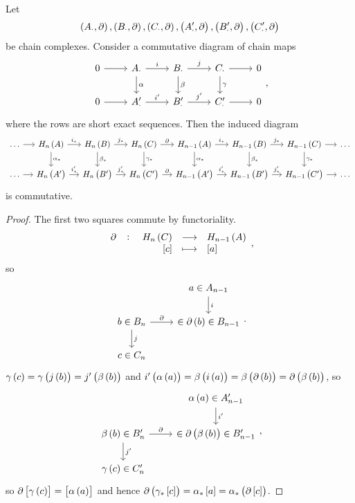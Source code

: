 \begin{proposition}
Let
$$ \br{A_\cdot, \partial}, \br{B_\cdot, \partial}, \br{C_\cdot, \partial}, \br{A_\cdot', \partial}, \br{B_\cdot', \partial}, \br{C_\cdot', \partial} $$
be chain complexes. Consider a commutative diagram of chain maps
$$
\begin{tikzcd}
0 \arrow{r} & A_\cdot \arrow{r}{i} \arrow{d}{\alpha} & B_\cdot \arrow{r}{j} \arrow{d}{\beta} & C_\cdot \arrow{r} \arrow{d}{\gamma} & 0 \\
0 \arrow{r} & A_\cdot' \arrow{r}{i'} & B_\cdot' \arrow{r}{j'} & C_\cdot' \arrow{r} & 0
\end{tikzcd},
$$
where the rows are short exact sequences. Then the induced diagram
$$
\begin{tikzcd}[column sep=small]
\dots \arrow{r} & H_n\br{A} \arrow{r}{i_*} \arrow{d}{\alpha_*} & H_n\br{B} \arrow{r}{j_*} \arrow{d}{\beta_*} & H_n\br{C} \arrow{r}{\partial} \arrow{d}{\gamma_*} & H_{n - 1}\br{A} \arrow{r}{i_*} \arrow{d}{\alpha_*} & H_{n - 1}\br{B} \arrow{r}{j_*} \arrow{d}{\beta_*} & H_{n - 1}\br{C} \arrow{r} \arrow{d}{\gamma_*} & \dots \\
\dots \arrow{r} & H_n\br{A'} \arrow{r}{i_*'} & H_n\br{B'} \arrow{r}{j_*'} & H_n\br{C'} \arrow{r}{\partial} & H_{n - 1}\br{A'} \arrow{r}{i_*'} & H_{n - 1}\br{B'} \arrow{r}{j_*'} & H_{n - 1}\br{C'} \arrow{r} & \dots
\end{tikzcd}
$$
is commutative.
\end{proposition}

\begin{proof}
The first two squares commute by functoriality.
$$ \function[\partial]{H_n\br{C}}{H_{n - 1}\br{A}}{\sbr{c}}{\sbr{a}}, $$
so
$$
\begin{tikzcd}
& a \in A_{n - 1} \arrow{d}{i} \\
b \in B_n \arrow{r}{\partial} \arrow{d}{j} & \in \partial\br{b} \in B_{n - 1} \\
c \in C_n &
\end{tikzcd}.
$$
$ \gamma\br{c} = \gamma\br{j\br{b}} = j'\br{\beta\br{b}} $ and $ i'\br{\alpha\br{a}} = \beta\br{i\br{a}} = \beta\br{\partial\br{b}} = \partial\br{\beta\br{b}} $, so
$$
\begin{tikzcd}
& \alpha\br{a} \in A_{n - 1}' \arrow{d}{i'} \\
\beta\br{b} \in B_n' \arrow{r}{\partial} \arrow{d}{j'} & \in \partial\br{\beta\br{b}} \in B_{n - 1}' \\
\gamma\br{c} \in C_n' &
\end{tikzcd},
$$
so $ \partial\sbr{\gamma\br{c}} = \sbr{\alpha\br{a}} $ and hence $ \partial\br{\gamma_*\sbr{c}} = \alpha_*\sbr{a} = \alpha_*\br{\partial\sbr{c}} $.
\end{proof}

